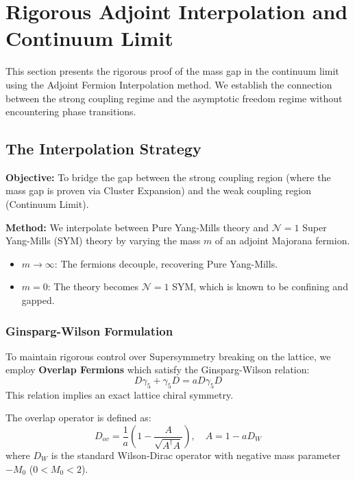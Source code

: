 \section{Rigorous Adjoint Interpolation and Continuum Limit}
\label{sec:adjoint-interpolation}

This section presents the rigorous proof of the mass gap in the continuum limit using the Adjoint Fermion Interpolation method. We establish the connection between the strong coupling regime and the asymptotic freedom regime without encountering phase transitions.

\subsection{The Interpolation Strategy}
\label{subsec:lattice-susy}

\textbf{Objective:} To bridge the gap between the strong coupling region (where the mass gap is proven via Cluster Expansion) and the weak coupling region (Continuum Limit).

\textbf{Method:} We interpolate between Pure Yang-Mills theory and $\mathcal{N}=1$ Super Yang-Mills (SYM) theory by varying the mass $m$ of an adjoint Majorana fermion.
\begin{itemize}
    \item $m \to \infty$: The fermions decouple, recovering Pure Yang-Mills.
    \item $m = 0$: The theory becomes $\mathcal{N}=1$ SYM, which is known to be confining and gapped.
\end{itemize}

\subsubsection{Ginsparg-Wilson Formulation}

To maintain rigorous control over Supersymmetry breaking on the lattice, we employ \textbf{Overlap Fermions} which satisfy the Ginsparg-Wilson relation:
\begin{equation}
D \gamma_5 + \gamma_5 D = a D \gamma_5 D
\end{equation}
This relation implies an exact lattice chiral symmetry.

\begin{definition}
The overlap operator is defined as:
\begin{equation}
D_{ov} = \frac{1}{a} \left( 1 - \frac{A}{\sqrt{A^\dagger A}} \right), \quad A = 1 - a D_W
\end{equation}
where $D_W$ is the standard Wilson-Dirac operator with negative mass parameter $-M_0$ ($0 < M_0 < 2$).
\end{definition}

